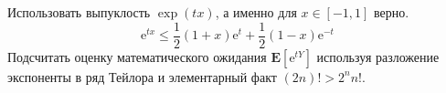 \begin{remark}
Использовать выпуклость $\exp(tx)$, а именно для $x\in[-1,1]$ верно.
\begin{equation*}
\text{e}^{tx}\leq \frac{1}{2}(1+x)\text{e}^{t} +\frac{1}{2}(1-x)\text{e}^{-t}
\end{equation*}
Подсчитать оценку математического ожидания $\mathbf{E}[\text{e}^{tY}]$ используя разложение экспоненты в ряд Тейлора и элементарный факт $(2n)!>2^nn!$.  
\end{remark}
\begin{comment}
\begin{problem}[Мартингальное неравенство Азумы-Хевдинга]

Пусть $\{X_i\}_{i=0}^{\infty}$ мартингал по отношению к фильтрации $\{\mathcal{F}_i\}$, пусть $Y_i = X_i-X_{i-1}$ соответствующая последовательность приращений. Тогда, если существуют такие $c_i>0$, что $|Y_i|\leq c_i$ для всех $i$, то 
\begin{equation*}
\mathbf{P}\{\sup_{n\geq m} |X_n-X_0|\geq t\}\leq 2\exp\bigg\{\frac{-t^2}{2\sum_{i=1}^{m}c^2_i}\biggl\}
\end{equation*}
\end{problem}

\begin{remark}

\begin{enumerate}
\item \textit{Использовать теорему Дуба.} 
\item \textit{Cпособ для доказательства не равномерного варианта теоремы использует результат задачи 12.}

Показать, что 
\begin{equation*}
\mathbf{E}\exp(sY_1+\dots+ sY_m) = \mathbf{E}\big[\exp(sY_1+\dots+sY_{m-1})\mathbf{E}[\exp(sY_m)|\mathcal{F}_{m-1}]\bigl] 
\end{equation*}
записать неравенство Чернова

\begin{equation*}
\mathbf{P}[Y_1+\dots+Y_m>t]\leq \exp\big[-st+\sum_{i=1}^mc^2_i s^2/2\bigr].
\end{equation*}
Остается оценить $s$ из минимизации правой части.
\end{enumerate}

\end{remark}

\end{comment}


